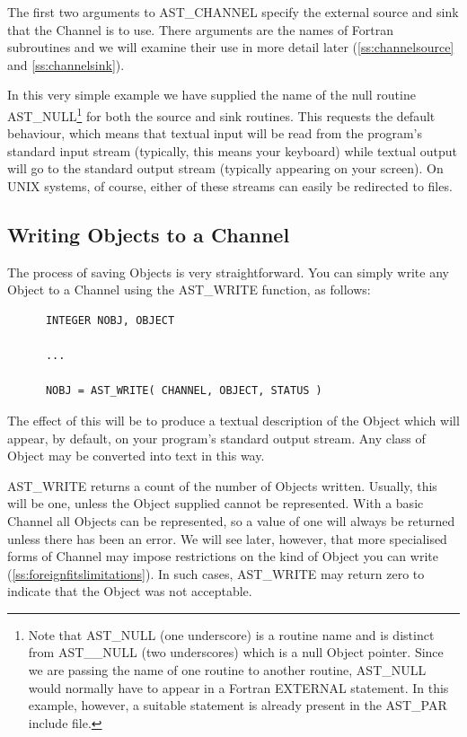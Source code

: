 \documentclass[twoside,11pt]{article}
\newcommand{\htmlref}[2]{#1}
\newcommand{\secref}[1]{\S\ref{#1}}
\renewcommand{\secref}[1]{\ref{#1}}
\begin{document}
The first two arguments to AST\_CHANNEL specify the external source
and sink that the Channel is to use. There arguments are the names of
Fortran subroutines and we will examine their use in more detail later
(\secref{ss:channelsource} and \secref{ss:channelsink}).

In this very simple example we have supplied the name of the null
routine AST\_NULL\footnote{Note that AST\_NULL (one underscore) is a
routine name and is distinct from AST\_\_NULL (two underscores) which
is a null \htmlref{Object}{Object} pointer.  Since we are passing the name of one
routine to another routine, AST\_NULL would normally have to appear in
a Fortran EXTERNAL statement. In this example, however, a suitable
statement is already present in the AST\_PAR include file.} for both
the source and sink routines.  This requests the default behaviour,
which means that textual input will be read from the program's
standard input stream (typically, this means your keyboard) while
textual output will go to the standard output stream (typically
appearing on your screen). On UNIX systems, of course, either of these
streams can easily be redirected to files.

\subsection{\label{ss:writingtoachannel}Writing Objects to a Channel}

The process of saving Objects is very straightforward. You can
simply write any \htmlref{Object}{Object} to a \htmlref{Channel}{Channel} using the \htmlref{AST\_WRITE}{AST_WRITE}
function, as follows:

\small
\begin{verbatim}
      INTEGER NOBJ, OBJECT

      ...

      NOBJ = AST_WRITE( CHANNEL, OBJECT, STATUS )
\end{verbatim}
\normalsize

The effect of this will be to produce a textual description of the
Object which will appear, by default, on your program's standard
output stream. Any class of Object may be converted into text in this
way.

AST\_WRITE returns a count of the number of Objects written. Usually,
this will be one, unless the Object supplied cannot be
represented. With a basic Channel all Objects can be represented, so a
value of one will always be returned unless there has been an
error. We will see later, however, that more specialised forms of
Channel may impose restrictions on the kind of Object you can write
(\secref{ss:foreignfitslimitations}). In such cases, AST\_WRITE may
return zero to indicate that the Object was not acceptable.
\end{document}
